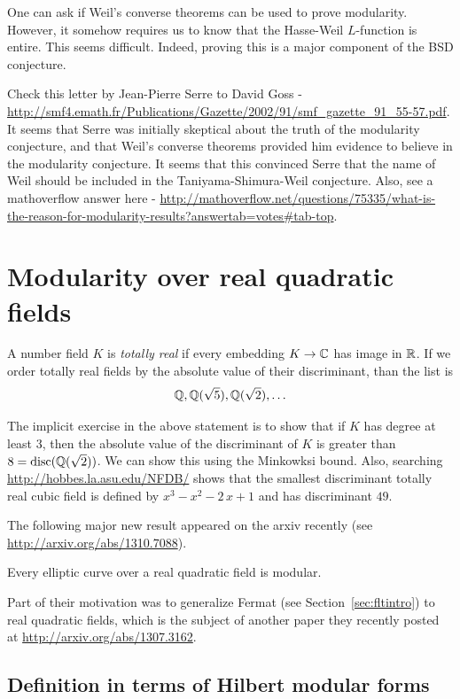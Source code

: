 \documentclass{book}
\begin{document}
One can ask if Weil's converse theorems can be used to prove modularity. However, it somehow requires us to know that the Hasse-Weil $L$-function is entire. This seems difficult. Indeed, proving this is a major component of the BSD conjecture.

Check this letter by Jean-Pierre Serre to David Goss - \url{http://smf4.emath.fr/Publications/Gazette/2002/91/smf_gazette_91_55-57.pdf}. It seems that Serre was initially skeptical about the truth of the modularity conjecture, and that Weil's converse theorems provided him evidence to believe in the modularity conjecture. It seems that this convinced Serre that the name of Weil should be included in the Taniyama-Shimura-Weil conjecture. Also, see a mathoverflow answer here - \url{http://mathoverflow.net/questions/75335/what-is-the-reason-for-modularity-results?answertab=votes#tab-top}.

\section{Modularity over real quadratic fields}

A number field $K$ is {\em totally real} if
every embedding $K\to \mathbb{C}$ has image in $\mathbb{R}$.
If we order totally real fields by the absolute
value of their discriminant, than the list is
$$
  \mathbb{Q}, \mathbb{Q}(\sqrt{5}), \mathbb{Q}(\sqrt{2}), \ldots
$$
\begin{exercise}
The implicit exercise in the above statement is to show
that if $K$ has degree at least $3$, then the
absolute value of the discriminant of $K$
is greater than $8=\text{disc}(\mathbb{Q}(\sqrt{2}))$.  We can show this using the
Minkowksi bound. Also, searching  \url{http://hobbes.la.asu.edu/NFDB/}
shows that the smallest discriminant
totally real cubic field is defined by
$x^{3} - x^{2} - 2 \, x + 1$ and has discriminant $49$.
\end{exercise}

The following major new result appeared on the arxiv recently (see
\url{http://arxiv.org/abs/1310.7088}).
\begin{theorem}
Every elliptic curve over a real quadratic field is modular.
\end{theorem}
Part of their motivation was to generalize
Fermat (see Section~\ref{sec:fltintro}) to real quadratic fields, which
is the subject of another paper they recently posted at \url{http://arxiv.org/abs/1307.3162}.


\subsection{Definition in terms of Hilbert modular forms}
\end{document}
